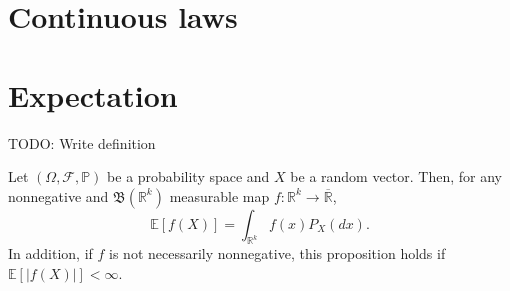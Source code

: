\section{Continuous laws}%
\label{sec:Continuous laws}

\section{Expectation}%
\label{sec:Expectation}
\begin{definition}[Expectation of $X$]
    \label{def:10.9}
    TODO: Write definition
\end{definition}

\begin{proposition}[Expectation of $f(X)$]
    \label{prop:10.3}
    Let $(\Omega, \mathcal{F}, \mathbb{P})$ be a probability space and $X$ be a random vector.
    Then, for any nonnegative and $\mathfrak{B}(\mathbb{R}^{k})$ measurable map $f: \mathbb{R}^{k}\to 
    \overline{\mathbb{R}}$,
    \[
    \mathbb{E}[f(X)]= \int_{\mathbb{R}^{k}} f(x)P_X(dx)
    .\] 
    In addition, if $f$ is not necessarily nonnegative, this proposition holds if $\mathbb{E}[|f(X)|]<\infty$.
\end{proposition}



